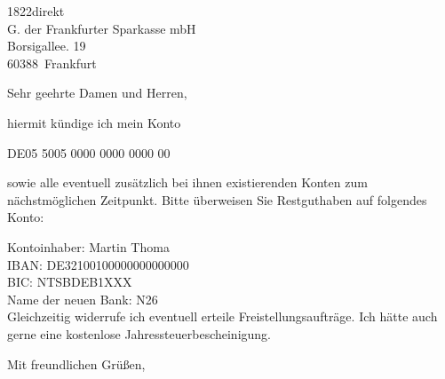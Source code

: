 \documentclass[a4paper, 12pt, KOMAold]{scrlttr2}
\newcommand{\Kundennr}{DE05 5005 0000 0000 0000 00}    %
\newcommand{\Empfaenger}{1822direkt} %
\newcommand{\EStrasse}{Borsigallee. 19 }    %
\newcommand{\EPLZ}{60388}                   %
\newcommand{\EOrt}{Frankfurt}               %
\begin{document}
    \begin{letter}{\Empfaenger \\ G. der Frankfurter Sparkasse mbH\\ \EStrasse \\ \EPLZ~\EOrt}
    \date{\today}%
    \subject{Kündigung}
    \opening{Sehr geehrte Damen und Herren,}
    hiermit kündige ich mein Konto

    {}\Kundennr{}

    sowie alle eventuell zusätzlich bei ihnen existierenden Konten
    zum nächstmöglichen Zeitpunkt.
    Bitte überweisen Sie Restguthaben auf folgendes Konto:

Kontoinhaber: Martin Thoma\\
IBAN: DE32100100000000000000\\
BIC: NTSBDEB1XXX\\
Name der neuen Bank: N26\\

Gleichzeitig widerrufe ich eventuell erteile Freistellungsaufträge. Ich hätte
auch gerne eine kostenlose Jahressteuerbescheinigung.

    \closing{Mit freundlichen Grüßen,}
    \end{letter}
\end{document}
